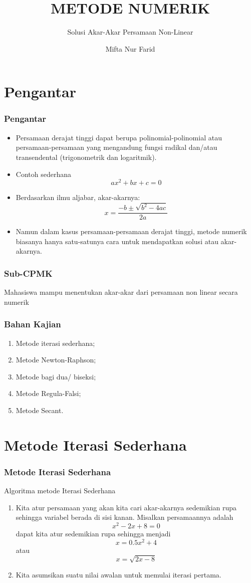 \documentclass[pdflatex,compress,mathserif]{beamer}
\title{METODE NUMERIK}
\subtitle{Solusi Akar-Akar Persamaan Non-Linear}
\author{Mifta Nur Farid}
\begin{document}
\section{Pengantar}

\begin{frame}
	\frametitle{Pengantar}
	\begin{itemize}
		\item Persamaan derajat tinggi dapat berupa polinomial-polinomial atau persamaan-persamaan yang mengandung fungsi radikal dan/atau transendental (trigonometrik dan logaritmik).
		\item Contoh sederhana
		$$ ax^2 + bx + c = 0 $$
		\item Berdasarkan ilmu aljabar, akar-akarnya:
		$$ x = \frac{-b \pm \sqrt{b^2 - 4ac}}{2a} $$
		\item Namun dalam kasus persamaan-persamaan derajat tinggi, metode numerik biasanya hanya satu-satunya cara untuk mendapatkan solusi atau akar-akarnya.
	\end{itemize}
\end{frame}

\begin{frame}
	\frametitle{Sub-CPMK}
	Mahasiswa mampu menentukan akar-akar dari persamaan non linear secara numerik
\end{frame}

\begin{frame}
	\frametitle{Bahan Kajian}
	\begin{enumerate}
		\item Metode iterasi sederhana;
		\item Metode Newton-Raphson;
		\item Metode bagi dua/ biseksi;
		\item Metode Regula-Falsi;
		\item Metode Secant.
	\end{enumerate}
\end{frame}

\section{Metode Iterasi Sederhana}

\begin{frame}
	\frametitle{Metode Iterasi Sederhana}
	Algoritma metode Iterasi Sederhana
	\begin{enumerate}
		\item Kita atur persamaan yang akan kita cari akar-akarnya sedemikian rupa sehingga variabel berada di sisi kanan. Misalkan persamaannya adalah
		$$ x^2 - 2x + 8 = 0 $$
		dapat kita atur sedemikian rupa sehingga menjadi
		$$ x = 0.5x^2 + 4 $$ atau $$ x = \sqrt{2x-8} $$
		\item Kita asumsikan suatu nilai awalan untuk memulai iterasi pertama.
	\end{enumerate}
\end{frame}
\end{document}
